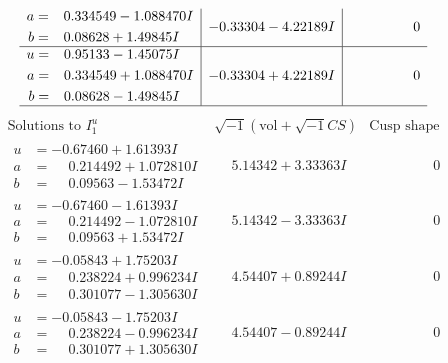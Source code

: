 \documentclass[1p]{elsarticle_modified}
\theoremstyle{definition}
\newcommand{\I}{\sqrt{-1}}
\begin{document}
$$\begin{array}{c|c|c}
\begin{aligned}
a &= \phantom{-}0.334549 - 1.088470 I \\
b &= \phantom{-}0.08628 + 1.49845 I\end{aligned}
 & -0.33304 - 4.22189 I & \phantom{-0.000000 } 0 \\ \hline\begin{aligned}
u &= \phantom{-}0.95133 - 1.45075 I \\
a &= \phantom{-}0.334549 + 1.088470 I \\
b &= \phantom{-}0.08628 - 1.49845 I\end{aligned}
 & -0.33304 + 4.22189 I & \phantom{-0.000000 } 0\\
 \hline 
 \end{array}$$\newpage$$\begin{array}{c|c|c}  
\text{Solutions to }I^u_{1}& \I (\text{vol} + \sqrt{-1}CS) & \text{Cusp shape}\\
 \hline 
\begin{aligned}
u &= -0.67460 + 1.61393 I \\
a &= \phantom{-}0.214492 + 1.072810 I \\
b &= \phantom{-}0.09563 - 1.53472 I\end{aligned}
 & \phantom{-}5.14342 + 3.33363 I & \phantom{-0.000000 } 0 \\ \hline\begin{aligned}
u &= -0.67460 - 1.61393 I \\
a &= \phantom{-}0.214492 - 1.072810 I \\
b &= \phantom{-}0.09563 + 1.53472 I\end{aligned}
 & \phantom{-}5.14342 - 3.33363 I & \phantom{-0.000000 } 0 \\ \hline\begin{aligned}
u &= -0.05843 + 1.75203 I \\
a &= \phantom{-}0.238224 + 0.996234 I \\
b &= \phantom{-}0.301077 - 1.305630 I\end{aligned}
 & \phantom{-}4.54407 + 0.89244 I & \phantom{-0.000000 } 0 \\ \hline\begin{aligned}
u &= -0.05843 - 1.75203 I \\
a &= \phantom{-}0.238224 - 0.996234 I \\
b &= \phantom{-}0.301077 + 1.305630 I\end{aligned}
 & \phantom{-}4.54407 - 0.89244 I & \phantom{-0.000000 } 0 \\ \hline\begin{aligned}

\end{aligned}
\end{array}$$
\end{document}
